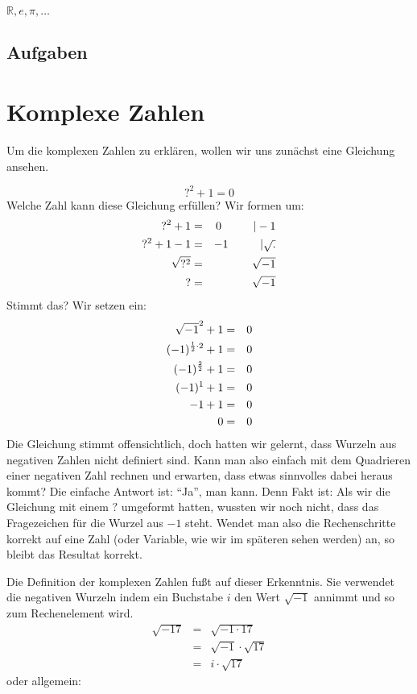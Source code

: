 $\mathbb{R}, e, \pi, \dots $

\section{Aufgaben}


\chapter{Komplexe Zahlen}

Um die komplexen Zahlen zu erklären, wollen wir uns zunächst eine Gleichung ansehen. 

\[ ?^2 +1 = 0 \]
Welche Zahl kann diese Gleichung erfüllen? Wir formen um:
\begin{eqnarray*}
?^2 +1 &=& 0 \hskip 1cm | -1 \\
?^2 +1 -1 &=& -1 \hskip 1cm | \sqrt{.} \\
\sqrt{?^2} &=& \sqrt{-1} \\
? &=& \sqrt{-1}
\end{eqnarray*}
Stimmt das? Wir setzen ein:
\begin{eqnarray*}
\sqrt{-1}^2 +1 &=& 0 \\
(-1)^{{1 \over 2}\cdot 2} +1 &=& 0 \\
(-1)^{{2 \over 2}} +1 &=& 0 \\
(-1)^{1} +1 &=& 0 \\
-1+1 &=& 0 \\
0 &=& 0
\end{eqnarray*}
Die Gleichung stimmt offensichtlich, doch hatten wir gelernt, dass Wurzeln aus negativen Zahlen nicht definiert sind. Kann man also einfach mit dem Quadrieren einer negativen Zahl rechnen und erwarten, dass etwas sinnvolles dabei heraus kommt? Die einfache Antwort ist: "`Ja"', man kann. Denn Fakt ist: Als wir die Gleichung mit einem $?$ umgeformt hatten, wussten wir noch nicht, dass das Fragezeichen für die Wurzel aus $-1$ steht. Wendet man also die Rechenschritte korrekt auf eine Zahl (oder Variable, wie wir im späteren sehen werden) an, so bleibt das Resultat korrekt. 

Die Definition der komplexen Zahlen fußt auf dieser Erkenntnis. Sie verwendet die negativen Wurzeln indem ein Buchstabe $i$ den Wert $\sqrt{-1}$ annimmt und so zum Rechenelement wird.
\begin{eqnarray*}
\sqrt{-17} &=& \sqrt{-1\cdot 17}\\
&=& \sqrt{-1}\cdot \sqrt{17}\\
&=& i \cdot \sqrt{17}
\end{eqnarray*}
oder allgemein:

